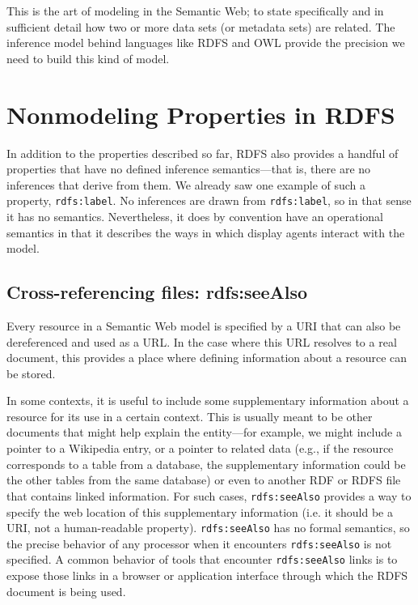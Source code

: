 This is the art of modeling in the Semantic Web; to state specifically and in sufficient 
detail how two or more data sets (or metadata sets) are related.  The inference model
behind languages like RDFS and OWL provide the precision we need to build this kind of model. 



\section{Nonmodeling Properties in RDFS}

In addition to the properties described so far, RDFS also provides a
handful of properties that have no defined inference semantics---that
is, there are no inferences that derive from them. We already saw one
example of such a property, \texttt{rdfs:label}. No inferences are drawn from
\texttt{rdfs:label}, so in that sense it has no semantics. Nevertheless, it does
by convention have an operational semantics in that it describes the
ways in which display agents interact with the model.

\subsection{Cross-referencing files: rdfs:seeAlso}

Every resource in a Semantic Web model is specified by a URI that can
also be dereferenced and used as a URL. In the case where this URL
resolves to a real document, this provides a place where defining
information about a resource can be stored.

In some contexts, it is useful to include some supplementary information
about a resource for its use in a certain context. This is usually meant
to be other documents that might help explain the entity---for example,
we might include a pointer to a Wikipedia entry, or a pointer to related
data (e.g., if the resource corresponds to a table from a database, the
supplementary information could be the other tables from the same
database) or even to another RDF or RDFS file that contains linked
information. For such cases, \texttt{rdfs:seeAlso} provides a way to specify the
web location of this supplementary information (i.e. it should be a URI,
not a human-readable property). \texttt{rdfs:seeAlso} has no formal semantics, so
the precise behavior of any processor when it encounters \texttt{rdfs:seeAlso} is
not specified. A common behavior of tools that encounter \texttt{rdfs:seeAlso}
links is to expose those links in a browser or application interface
through which the RDFS document is being used.

